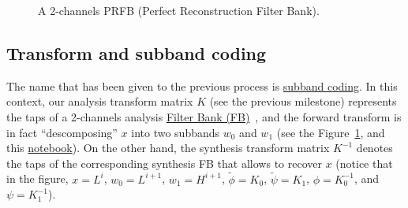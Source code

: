 \begin{figure}
  \centering
  \caption{A 2-channels PRFB (Perfect Reconstruction Filter Bank).}
  \label{fig:PRFB}
\end{figure}

\subsection{Transform and subband coding}
The name that has been given to the previous process is
\href{https://en.wikipedia.org/wiki/Sub-band_coding}{subband
  coding}. In this context, our analysis transform matrix $K$ (see the
previous milestone) represents the taps of a 2-channels analysis
\href{https://en.wikipedia.org/wiki/Filter_bank}{Filter Bank
  (FB)}~\cite{vetterli1995wavelets}, and the forward transform is in
fact ``descomposing'' $x$ into two subbands $w_0$ and $w_1$ (see the
Figure~\ref{fig:PRFB}, and this
\href{https://github.com/Tecnologias-multimedia/intercom/blob/master/docs/PRFB.ipynb}{notebook}). On
the other hand, the synthesis transform matrix $K^{-1}$ denotes the
taps of the corresponding synthesis FB that allows to recover $x$
(notice that in the figure, $x=L^i$, $w_0=L^{i+1}$, $w_1=H^{i+1}$,
$\tilde\phi=K_0$, $\tilde\psi=K_1$, $\phi=K^{-1}_0$, and
$\psi=K^{-1}_1$).

